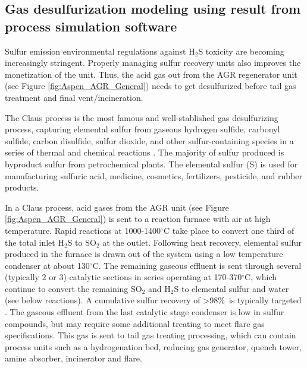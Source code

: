 \documentclass[11pt]{report}
\begin{document}
\begin{landscape}
\end{landscape}

\clearpage



\subsection{Gas desulfurization modeling using result from process simulation software}

Sulfur emission environmental regulations against H$_2$S toxicity are becoming increasingly stringent. Properly managing sulfur recovery units also improves the monetization of the unit. Thus, the acid gas out from the AGR regenerator unit (see Figure \ref{fig:Aspen_AGR_General}) needs to get desulfurized before tail gas treatment and final vent/incineration. 

The Claus process is the most famous and well-stablished gas desulfurizing process, capturing elemental sulfur from gaseous hydrogen sulfide, carbonyl sulfide, carbon disulfide, sulfur dioxide, and other sulfur-containing species in a series of thermal and chemical reactions \cite{ClausAspen}. The majority of sulfur produced is byproduct sulfur from petrochemical plants. The elemental sulfur (S) is used for manufacturing sulfuric acid, medicine, cosmetics, fertilizers, pesticide, and rubber products.

In a Claus process, acid gases from the AGR unit (see Figure \ref{fig:Aspen_AGR_General}) is sent to a reaction furnace with air at high temperature. Rapid reactions at 1000-1400$^\circ$C take place to convert one third of the total inlet H$_2$S to SO$_2$ at the outlet. Following heat recovery, elemental sulfur produced in the furnace is drawn out of the system using a low temperature condenser at about 130$^\circ$C. The remaining gaseous effluent is sent through several (typically 2 or 3) catalytic sections in series operating at 170-370$^\circ$C, which continue to convert the remaining SO$_2$ and H$_2$S to elemental sulfur and water (see below reactions). A cumulative sulfur recovery of >98\%\ is typically targeted \cite{ClausAspen}. The gaseous effluent from the last catalytic stage condenser is low in sulfur compounds, but may require some additional treating to meet flare gas specifications. This gas is sent to tail gas treating processing, which can contain process units such as a hydrogenation bed, reducing gas generator, quench tower, amine absorber, incinerator and flare.
\end{document}
